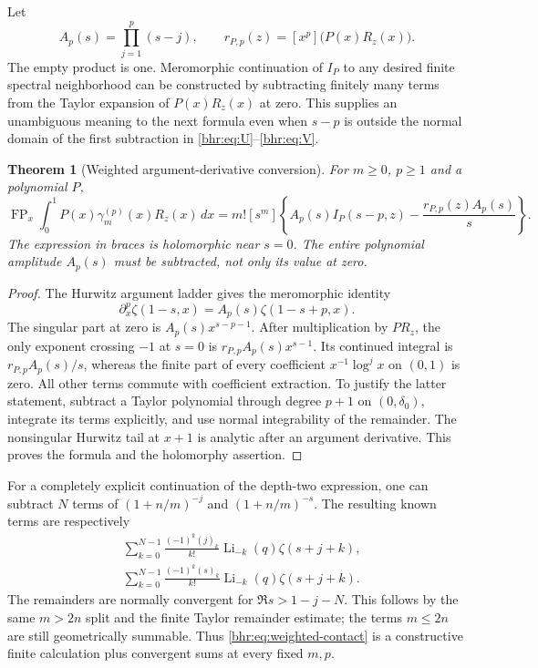 \documentclass[11pt]{article}
\numberwithin{equation}{section}
\theoremstyle{plain}
\newtheorem{theorem}{Theorem}[section]
\theoremstyle{definition}
\theoremstyle{remark}
\DeclareMathOperator{\Li}{Li}
\DeclareMathOperator{\FP}{FP}
\begin{document}
Let
\begin{equation}\label{bhr:eq:Ap}
 A_p(s)=\prod_{j=1}^p(s-j),\qquad
 r_{P,p}(z)=[x^p]\bigl(P(x)R_z(x)\bigr).
\end{equation}
The empty product is one. Meromorphic continuation of $I_P$ to
any desired finite spectral neighborhood can be constructed by
subtracting finitely many terms from the Taylor expansion of
$P(x)R_z(x)$ at zero. This supplies an unambiguous meaning to
the next formula even when $s-p$ is outside the normal domain
of the first subtraction in \eqref{bhr:eq:U}--\eqref{bhr:eq:V}.

\begin{theorem}[Weighted argument-derivative conversion]\label{bhr:thm:weighted-contact}
For $m\ge0$, $p\ge1$ and a polynomial $P$,
\begin{equation}\label{bhr:eq:weighted-contact}
 \boxed{\displaystyle
 \FP_x\int_0^1P(x)\gamma_m^{(p)}(x)R_z(x)\,dx
   =m![s^m]\left\{
       A_p(s)I_P(s-p,z)-\frac{r_{P,p}(z)A_p(s)}s\right\}.}
\end{equation}
The expression in braces is holomorphic near $s=0$.
The entire polynomial amplitude $A_p(s)$ must be subtracted,
not only its value at zero.
\end{theorem}
\begin{proof}
The Hurwitz argument ladder gives the meromorphic identity
\[
 \partial_x^p\zeta(1-s,x)=A_p(s)\zeta(1-s+p,x).
\]
The singular part at zero is $A_p(s)x^{s-p-1}$.
After multiplication by $P R_z$, the only exponent crossing
$-1$ at $s=0$ is $r_{P,p}A_p(s)x^{s-1}$.
Its continued integral is $r_{P,p}A_p(s)/s$, whereas the
finite part of every coefficient $x^{-1}\log^j x$ on $(0,1)$
is zero. All other terms commute with coefficient extraction.
To justify the latter statement, subtract a Taylor polynomial
through degree $p+1$ on $(0,\delta_0)$, integrate its terms
explicitly, and use normal integrability of the remainder.
The nonsingular Hurwitz tail at $x+1$ is analytic after an
argument derivative. This proves the formula and the
holomorphy assertion.
\end{proof}

For a completely explicit continuation of the depth-two expression,
one can subtract $N$ terms of $(1+n/m)^{-j}$ and $(1+n/m)^{-s}$.
The resulting known terms are respectively
\begin{align}
 &\sum_{k=0}^{N-1}\frac{(-1)^k(j)_k}{k!}
         \Li_{-k}(q)\zeta(s+j+k),\\
 &\sum_{k=0}^{N-1}\frac{(-1)^k(s)_k}{k!}
         \Li_{-k}(q)\zeta(s+j+k).
\end{align}
The remainders are normally convergent for $\Re s>1-j-N$.
This follows by the same $m>2n$ split and the finite Taylor
remainder estimate; the terms $m\le2n$ are still geometrically
summable. Thus \eqref{bhr:eq:weighted-contact} is a constructive
finite calculation plus convergent sums at every fixed $m,p$.
\end{document}
